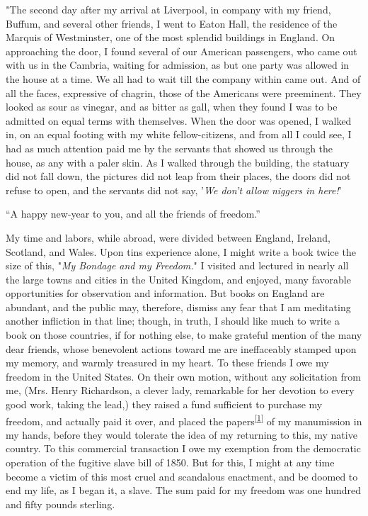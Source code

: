 "The second day after my arrival at Liverpool, in company
{\protect\hypertarget{373}{}{}}with my friend, Buffum, and several other
friends, I went to Eaton Hall, the residence of the Marquis of
Westminster, one of the most splendid buildings in England. On
approaching the door, I found several of our American passengers, who
came out with us in the Cambria, waiting for admission, as but one party
was allowed in the house at a time. We all had to wait till the company
within came out. And of all the faces, expressive of chagrin, those of
the Americans were preeminent. They looked as sour as vinegar, and as
bitter as gall, when they found I was to be admitted on equal terms with
themselves. When the door was opened, I walked in, on an equal footing
with my white fellow-citizens, and from all I could see, I had as much
attention paid me by the servants that showed us through the house, as
any with a paler skin. As I walked through the building, the statuary
did not fall down, the pictures did not leap from their places, the
doors did not refuse to open, and the servants did not say, {'}\emph{We
don't allow niggers in here!}{'}

``A happy new-year to you, and all the friends of freedom.''

My time and labors, while abroad, were divided between England, Ireland,
Scotland, and Wales. Upon tins experience alone, I might write a book
twice the size of this, "\emph{My Bondage and my Freedom.}" I visited
and lectured in nearly all the large towns and cities in the United
Kingdom, and enjoyed, many favorable opportunities for observation and
information. But books on England are abundant, and the public may,
therefore, dismiss any fear that I am meditating another infliction in
that line; though, in truth, I should like much to write a book on those
countries, if for nothing else, to make grateful mention of the many
dear friends, whose benevolent {\protect\hypertarget{374}{}{}}actions
toward me are ineffaceably stamped upon my memory, and warmly treasured
in my heart. To these friends I owe my freedom in the United States. On
their own motion, without any solicitation from me, (Mrs. Henry
Richardson, a clever lady, remarkable for her devotion to every good
work, taking the lead,) they raised a fund sufficient to purchase my
freedom, and actually paid it over, and placed the
papers\textsuperscript{\protect\hyperlink{cite_note-p374-1}{{[}1{]}}} of
{\protect\hypertarget{375}{}{}}my manumission in my hands, before they
would tolerate the idea of my returning to this, my native country. To
this commercial transaction I owe my exemption from the democratic
operation of the fugitive slave bill of 1850. But for this, I might at
any time become a victim of this most cruel and scandalous enactment,
and be doomed to end my life, as I began it, a slave. The sum paid for
my freedom was one hundred and fifty pounds sterling.

